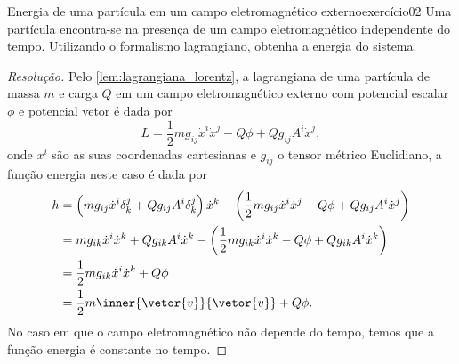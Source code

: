 \begin{exercício}{Energia de uma partícula em um campo eletromagnético externo}{exercício02}
    Uma partícula encontra-se na presença de um campo eletromagnético independente do tempo. Utilizando o formalismo lagrangiano, obtenha a energia do sistema.
\end{exercício}
\begin{proof}[Resolução]
    Pelo \cref{lem:lagrangiana_lorentz}, a lagrangiana de uma partícula de massa \(m\) e carga \(Q\) em um campo eletromagnético externo com potencial escalar \(\phi\) e potencial vetor  é dada por
    \begin{equation*}
        L = \frac12 m g_{ij} \dot{x}^i \dot{x}^j - Q\phi + Q g_{ij} A^i \dot{x}^j,
    \end{equation*}
    onde \(x^i\) são as suas coordenadas cartesianas e \(g_{ij}\) o tensor métrico Euclidiano, a função energia neste caso é dada por
    \begin{align*}
        h &= \left(mg_{ij} \dot{x}^i \delta^j_k + Q g_{ij} A^i \delta^j_k\right)\dot{x}^k - \left( \frac12 m g_{ij} \dot{x}^i \dot{x}^j - Q\phi +Q g_{ij} A^i \dot{x}^j\right)\\
          &= m g_{ik}\dot{x}^i \dot{x}^k + Qg_{ik}A^i\dot{x}^k - \left(\frac12 m g_{ik} \dot{x}^i \dot{x}^k - Q\phi + Qg_{ik} A^i \dot{x}^k\right)\\
          &= \frac12 m g_{ik} \dot{x}^i\dot{x}^k + Q\phi\\
          &= \frac12 m \inner{\vetor{v}}{\vetor{v}} + Q\phi.
    \end{align*}
    No caso em que o campo eletromagnético não depende do tempo, temos que a função energia é constante no tempo.
\end{proof}
